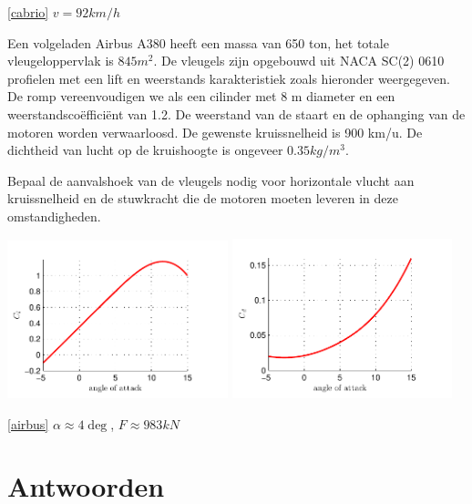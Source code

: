 \begin{antwoord}{\ref{cabrio}}
	$v=92\unit{km/h}$
\end{antwoord}
\begin{toepassing}[*]
	\label{airbus}
Een volgeladen Airbus A380 heeft een massa van 650 ton, het totale vleugeloppervlak is $845\unit{m^2}$. De vleugels zijn opgebouwd uit NACA SC(2) 0610 profielen met een lift en weerstands karakteristiek zoals hieronder weergegeven. De romp vereenvoudigen we als een cilinder met 8 m diameter en een weerstandscoëfficiënt van 1.2. De weerstand van de staart en de ophanging van de motoren worden verwaarloosd. De gewenste kruissnelheid is 900 km/u. De dichtheid van lucht op de kruishoogte is ongeveer $0.35\unit{kg/m^3}$.
		
Bepaal de aanvalshoek van de vleugels nodig voor horizontale vlucht aan kruissnelheid en de stuwkracht die de motoren moeten leveren in deze omstandigheden.

	\centering
	\includegraphics[width=0.48\textwidth]{fig/uitwendige_stroming/NACA_SC(2)_0610_Cl.pdf}
	\includegraphics[width=0.48\textwidth]{fig/uitwendige_stroming/NACA_SC(2)_0610_Cd.pdf}
\end{toepassing}
\begin{antwoord}{\ref{airbus}}
	$\alpha \approx 4\deg$, $F \approx 983\unit{kN}$
\end{antwoord}


\section*{Antwoorden}
	\begin{multicols}{2}
	\end{multicols}